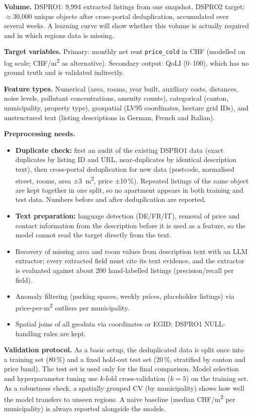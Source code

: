 \documentclass[11pt,a4paper]{article}
\begin{document}
\textbf{Volume.} DSPRO1: 9{,}994 extracted listings from one snapshot. DSPRO2 target: $\approx$30{,}000 unique objects after cross-portal deduplication, accumulated over several weeks. A learning curve will show whether this volume is actually required and in which regions data is missing.

\textbf{Target variables.} Primary: monthly net rent \texttt{price\_cold} in CHF (modelled on log scale; CHF/m\textsuperscript{2} as alternative). Secondary output: QoLI (0--100), which has no ground truth and is validated indirectly.

\textbf{Feature types.} Numerical (area, rooms, year built, auxiliary costs, distances, noise levels, pollutant concentrations, amenity counts), categorical (canton, municipality, property type), geospatial (LV95 coordinates, hectare grid IDs), and unstructured text (listing descriptions in German, French and Italian).

\textbf{Preprocessing needs.}
\begin{itemize}
    \item \textbf{Duplicate check:} first an audit of the existing DSPRO1 data (exact duplicates by listing ID and URL, near-duplicates by identical description text), then cross-portal deduplication for new data (postcode, normalised street, rooms, area $\pm$3~m\textsuperscript{2}, price $\pm$10\,\%). Repeated listings of the same object are kept together in one split, so no apartment appears in both training and test data. Numbers before and after deduplication are reported.
    \item \textbf{Text preparation:} language detection (DE/FR/IT), removal of price and contact information from the description before it is used as a feature, so the model cannot read the target directly from the text.
    \item Recovery of missing area and room values from description text with an LLM extractor; every extracted field must cite its text evidence, and the extractor is evaluated against about 200 hand-labelled listings (precision/recall per field).
    \item Anomaly filtering (parking spaces, weekly prices, placeholder listings) via price-per-m\textsuperscript{2} outliers per municipality.
    \item Spatial joins of all geodata via coordinates or EGID; DSPRO1 NULL-handling rules are kept.
\end{itemize}

\textbf{Validation protocol.} As a basic setup, the deduplicated data is split once into a training set (80\,\%) and a fixed hold-out test set (20\,\%, stratified by canton and price band). The test set is used only for the final comparison. Model selection and hyperparameter tuning use $k$-fold cross-validation ($k=5$) on the training set. As a robustness check, a spatially grouped CV (by municipality) shows how well the model transfers to unseen regions. A naive baseline (median CHF/m\textsuperscript{2} per municipality) is always reported alongside the models.
\end{document}
